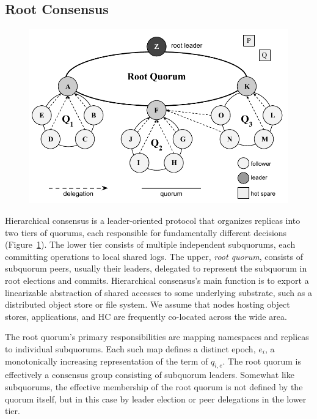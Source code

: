 \subsection{Root Consensus}
\label{ch03_root_consensus}

\begin{figure}
    \begin{center}
        \includegraphics[width=5in]{figures/ch03_election.pdf}
    \end{center}
    \renewcommand{\baselinestretch}{1}
    \small\normalsize

    \begin{quote}
        \caption[Delegated Votes]{}
        \label{fig:ch03_tiers}
    \end{quote}
\end{figure}
\renewcommand{\baselinestretch}{2}
\small\normalsize

Hierarchical consensus is a leader-oriented protocol that organizes replicas into two tiers of quorums, each responsible for fundamentally different decisions (Figure~\ref{fig:ch03_tiers}).
The lower tier consists of multiple independent subquorums, each committing operations to local shared logs.
The upper,  \emph{root quorum}, consists of subquorum peers, usually their leaders, delegated to represent the subquorum in root elections and commits.
Hierarchical consensus's main function is to export a linearizable abstraction of shared accesses to some underlying substrate, such as a distributed object store or file system.
We assume that nodes hosting object stores, applications, and HC are frequently co-located across the wide area.

The root quorum's primary responsibilities are mapping namespaces and replicas to individual subquorums.
Each such map defines a distinct epoch, $e_i$, a monotonically increasing representation of the term of $q_{i,e}$.
The root quorum is effectively a consensus group consisting of subquorum leaders.
Somewhat like subquorums, the effective membership of the root quorum is not defined by the quorum itself, but in this case by leader election or peer delegations in the lower tier.


